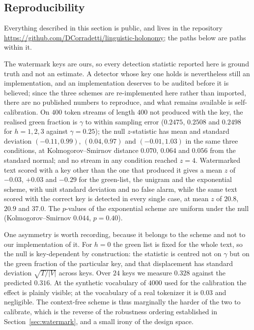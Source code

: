 \documentclass{article}
\theoremstyle{plain}
\theoremstyle{definition}
\numberwithin{equation}{section}
\begin{document}
\subsection{Reproducibility}\label{sec:repro}

Everything described in this section is public, and lives in the
repository
\url{https://github.com/DCorradetti/linguistic-holonomy}; the paths
below are paths within it. 

The watermark keys are ours, so every detection statistic reported here
is ground truth and not an estimate. A detector whose key one holds is
nevertheless still an implementation, and an implementation deserves to
be audited before it is believed; since the three schemes are
re-implemented here rather than imported, there are no published numbers
to reproduce, and what remains available is self-calibration. On $400$
token streams of length $400$ not produced with the key, the realised
green fraction is $\gamma$ to within sampling error ($0.2475$, $0.2508$
and $0.2498$ for $h = 1,2,3$ against $\gamma = 0.25$); the null
$z$-statistic has mean and standard deviation $(-0.11, 0.99)$,
$(0.04, 0.97)$ and $(-0.01, 1.03)$ in the same three conditions, at
Kolmogorov--Smirnov distance $0.070$, $0.064$ and $0.056$ from the
standard normal; and no stream in any condition reached $z = 4$.
Watermarked text scored with a key other than the one that produced it
gives a mean $z$ of $-0.03$, $+0.03$ and $-0.29$ for the green-list, the
unigram and the exponential scheme, with unit standard deviation and no
false alarm, while the same text scored with the correct key is detected
in every single case, at mean $z$ of $20.8$, $20.9$ and $37.0$. The
$p$-values of the exponential scheme are uniform under the null
(Kolmogorov--Smirnov $0.044$, $p = 0.40$).

One asymmetry is worth recording, because it belongs to the scheme and
not to our implementation of it. For $h = 0$ the green list is fixed for
the whole text, so the null is key-dependent by construction: the
statistic is centred not on $\gamma$ but on the green fraction of the
particular key, and that displacement has standard deviation
$\sqrt{T/|V|}$ across keys. Over $24$ keys we measure $0.328$ against
the predicted $0.316$. At the synthetic vocabulary of $4000$ used for
the calibration the effect is plainly visible; at the vocabulary of a
real tokenizer it is $0.03$ and negligible. The context-free scheme is
thus marginally the harder of the two to calibrate, which is the reverse
of the robustness ordering established in Section~\ref{sec:watermark},
and a small irony of the design space.
\end{document}
